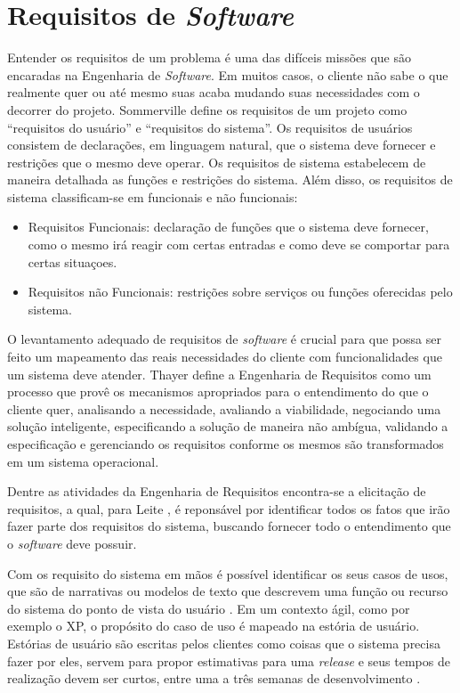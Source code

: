 \section{Requisitos de \textit{Software}}
Entender os requisitos de um problema é uma das difíceis missões
que são encaradas na Engenharia de \textit{Software}. Em muitos casos, o cliente não sabe o que realmente quer ou até mesmo
suas acaba mudando suas necessidades com o decorrer do projeto.   Sommerville \cite{sommerville_2006} define os requisitos de um projeto como ``requisitos do usuário'' e ``requisitos do sistema''. Os requisitos de usuários consistem de declarações, em
linguagem natural, que o sistema deve fornecer e restrições que o mesmo deve
operar. Os requisitos de sistema estabelecem de maneira detalhada as
funções e restrições do sistema. Além disso, os requisitos de sistema
classificam-se em funcionais e não funcionais:

\begin{itemize}
    \item Requisitos Funcionais: declaração de funções que o sistema deve fornecer, como o mesmo irá reagir com certas entradas e como deve se comportar para certas situaçoes.
    \item Requisitos não Funcionais: restrições sobre serviços ou funções oferecidas pelo sistema.
\end{itemize}

O levantamento adequado de requisitos de \textit{software} é crucial para que possa ser feito um mapeamento das reais necessidades do cliente com funcionalidades que um sistema deve atender. Thayer \cite{thayer_1997} define a Engenharia de Requisitos como um processo que provê os mecanismos apropriados para o entendimento do que o cliente quer, analisando a necessidade, avaliando a viabilidade, negociando uma solução inteligente, especificando a solução de maneira não ambígua, validando a especificação e gerenciando os requisitos conforme os mesmos são transformados em um sistema operacional.

Dentre as atividades da Engenharia de Requisitos encontra-se a elicitação de requisitos, a qual, para Leite \cite{leite_1994}, é reponsável por identificar todos os fatos que irão fazer parte dos requisitos do sistema, buscando fornecer todo o entendimento que o \textit{software} deve possuir.

Com os requisito do sistema em mãos é possível identificar os seus casos de usos, que são de narrativas ou modelos de texto que descrevem uma função ou recurso do sistema do ponto de vista do usuário \cite{pressman_2009}. Em um contexto ágil, como por exemplo o XP, o propósito do caso de uso é mapeado na estória de usuário. Estórias de usuário são escritas pelos clientes como coisas que o sistema precisa fazer por eles, servem para propor estimativas para uma \textit{release} e seus tempos de realização devem ser curtos, entre uma a três semanas de desenvolvimento \cite{beck_2004}.

